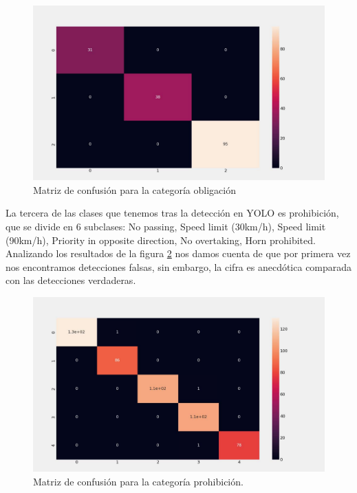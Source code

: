 \begin{figure}[H]
    \centering
 	\includegraphics[width=\textwidth]{Imagenes/IA/obligacion_confusion.pdf}
    \caption{Matriz de confusión para la categoría obligación}
    \label{obconf}
\end{figure}

La tercera de las clases que tenemos tras la detección en YOLO es prohibición, que se divide en 6 subclases: No passing, Speed limit (30km/h), Speed limit (90km/h), Priority in opposite direction, No overtaking, Horn prohibited. Analizando los resultados de la figura \ref{probconf} nos damos cuenta de que por primera vez nos encontramos detecciones falsas, sin embargo, la cifra es anecdótica comparada con las detecciones verdaderas.\\

\begin{figure}[H]
    \centering
 	\includegraphics[width=\textwidth]{Imagenes/IA/prohibicion_confusion.pdf}
    \caption{Matriz de confusión para la categoría prohibición.}
    \label{probconf}
\end{figure}

